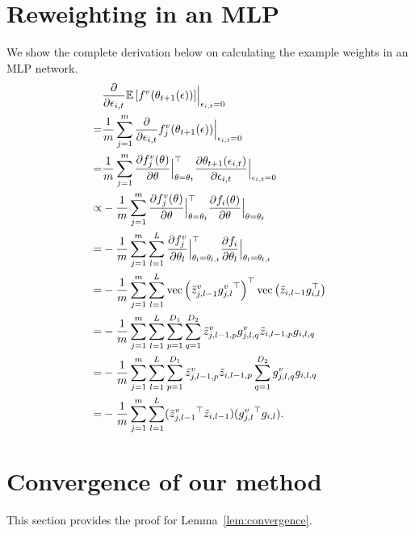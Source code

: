 \appendix

\section{Reweighting in an MLP}
\label{sec:mlp_derive}
We show the complete derivation below on calculating the example weights in an MLP network.
\begin{align}
&\frac{\partial}{\partial \epsilon_{i,t}} \mathbb{E} \left[ f^v(\theta_{t+1}(\epsilon)) \right]
\Bigr|_{\epsilon_{i,t}=0}\\
=&\frac{1}{m}\sum_{j=1}^m \frac{\partial}{\partial \epsilon_{i,t}} f_j^v(\theta_{t+1}(\epsilon))
\Bigr|_{\epsilon_{i,t}=0}\\
=&\frac{1}{m}\sum_{j=1}^m \frac{\partial f_j^v(\theta)}{\partial \theta}\Bigr|_{\theta=\theta_t}^\top
\frac{\partial \theta_{t+1}(\epsilon_{i,t})} {\partial \epsilon_{i,t}}\Bigr|_{\epsilon_{i,t}=0}\\
\propto&-\frac{1}{m}\sum_{j=1}^m \frac{\partial f_j^v(\theta)}{\partial \theta}\Bigr|_{\theta=\theta_t}^\top
\frac{\partial f_i(\theta)}{\partial \theta}\Bigr|_{\theta=\theta_t}\\
=&-\frac{1}{m}\sum_{j=1}^m \sum_{l=1}^L
\frac{\partial f_j^v}{\partial \theta_l}\Bigr|_{\theta_l=\theta_{l,t}}^\top
\frac{\partial f_i}{\partial \theta_{l}}\Bigr|_{\theta_l=\theta_{l,t}}\\
=&-\frac{1}{m}\sum_{j=1}^m \sum_{l=1}^L
\operatorname*{vec} \left( \tilde{z}_{j,l-1}^v {g_{j,l}^v}^\top \right)^\top
\operatorname*{vec} \left( \tilde{z}_{i,l-1} g_{i,l}^\top \right)\\
=&-\frac{1}{m}\sum_{j=1}^m \sum_{l=1}^L \sum_{p=1}^{D_1} \sum_{q=1}^{D_2}
\tilde{z}_{j,l-1,p}^v g_{j,l,q}^v \tilde{z}_{i,l-1,p} g_{i,l,q}\\
=&-\frac{1}{m}\sum_{j=1}^m \sum_{l=1}^L
\sum_{p=1}^{D_1} \tilde{z}_{j,l-1,p}^v \tilde{z}_{i,l-1,p}
\sum_{q=1}^{D_2} g_{j,l,q}^v g_{i,l,q}\\
=&-\frac{1}{m}\sum_{j=1}^m \sum_{l=1}^L
(\tilde{z}^v_{j,l-1}{}^\top
\tilde{z}_{i,l-1})
(g^v_{j,l}{}^\top g_{i,l}).
\end{align}

\section{Convergence of our method}
\label{sec:lemproof}
This section provides the proof for Lemma~\ref{lem:convergence}.

\begin{lem*}

\end{lem*}

